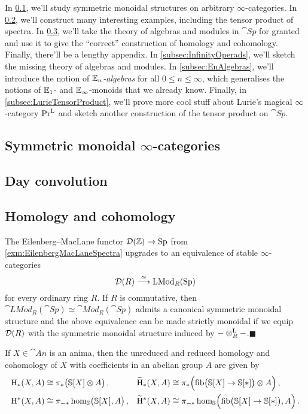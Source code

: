 \documentclass[DIV=12,numbers=enddot,leqno,bibliography=totoc]{scrartcl}
\begin{document}
	In \cref{subsec:SymmetricMonoidal}, we'll study symmetric monoidal structures on arbitrary $\infty$-categories. In \cref{subsec:DayConvolution}, we'll construct many interesting examples, including the tensor product of spectra. In \cref{subsec:Homology}, we'll take the theory of algebras and modules in $\cat{Sp}$ for granted and use it to give the \enquote{correct} construction of homology and cohomology. Finally, there'll be a lengthy appendix. In \cref{subsec:InfinityOperads}, we'll sketch the missing theory of algebras and modules. In \cref{subsec:EnAlgebras}, we'll introduce the notion of \emph{$\mathbb{E}_n$-algebras} for all $0\leqslant n\leqslant \infty$, which generalises the notions of $\mathbb{E}_1$- and $\mathbb{E}_\infty$-monoids that we already know. Finally, in \cref{subsec:LurieTensorProduct}, we'll prove more cool stuff about Lurie's magical $\infty$-category $\mathrm{Pr}^{\mathrm{L}}$ and sketch another construction of the tensor product on $\cat{Sp}$.
	
	
	\subsection{Symmetric monoidal \texorpdfstring{$\infty$}{Infinity}-categories}\label{subsec:SymmetricMonoidal}
	
	\subsection{Day convolution}\label{subsec:DayConvolution}
	
	\subsection{Homology and cohomology}\label{subsec:Homology}
	\begin{thm}\label{thm:DRIsModulesOverHR}
		The Eilenberg--MacLane functor $\mathcal{D}(\mathbb{Z})\rightarrow \mathrm{Sp}$ from \cref{exm:EilenbergMacLaneSpectra} upgrades to an equivalence of stable $\infty$-categories
		\begin{equation*}
			\mathcal{D}(R)\overset{\simeq}{\longrightarrow} \mathrm{LMod}_{R}(\mathrm{Sp})
		\end{equation*}
		for every ordinary ring $R$. If $R$ is commutative, then $\cat{LMod}_{R}(\cat{Sp})\simeq \cat{Mod}_R(\cat{Sp})$ admits a canonical symmetric monoidal structure and the above equivalence can be made strictly monoidal if we equip $\mathcal{D}(R)$ with the symmetric monoidal structure induced by $-\otimes^{\mathrm{L}}_R-$.\hfill$\blacksquare$
	\end{thm}
	\begin{cor}\label{cor:Homology}
		If $X\in\cat{An}$ is an anima, then the unreduced and reduced homology and cohomology of $X$ with coefficients in an abelian group $A$ are given by
		\begin{align*}
			\mathrm{H}_*(X,A)&\cong \pi_*\bigl(\mathbb{S}[X]\otimes A\bigr)\,,& \widetilde{\mathrm{H}}_*(X,A)&\cong \pi_*\Bigl(\operatorname{fib}\bigl(\mathbb{S}[X]\rightarrow \mathbb{S}[*]\bigr)\otimes A\Bigr)\,,\\
			\mathrm{H}^*(X,A)&\cong \pi_{-*}\hom_{\mathbb{S}}\bigl(\mathbb{S}[X], A\bigr)\,,& \widetilde{\mathrm{H}}^*(X,A)&\cong \pi_{-*}\hom_{\mathbb{S}}\Bigl(\operatorname{fib}\bigl(\mathbb{S}[X]\rightarrow \mathbb{S}[*]\bigr), A\Bigr)\,.
		\end{align*}
	\end{cor}
	
\end{document}
